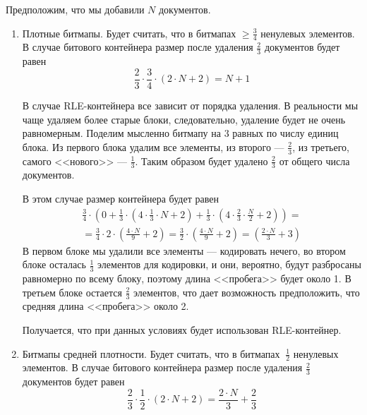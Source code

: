 Предположим, что мы добавили $N$ документов.
\begin{enumerate}
    \item Плотные битмапы. Будет считать, что в битмапах $\geq \frac{3}{4}$
    ненулевых элементов. В случае битового контейнера размер после удаления
    $\frac{2}{3}$ документов будет равен
    \begin{equation}
        \frac{2}{3} \cdot \frac{3}{4} \cdot \left(2\cdot N + 2\right) = N + 1
    \end{equation}
    
    В случае RLE-контейнера все зависит от порядка удаления. В реальности
    мы чаще удаляем более старые блоки, следовательно, удаление будет не очень
    равномерным. Поделим мысленно битмапу на 3 равных по числу единиц блока.
    Из первого блока удалим все элементы, из второго — $\frac{2}{3}$, из
    третьего, самого <<нового>> — $\frac{1}{3}$. Таким образом будет удалено
    $\frac{2}{3}$ от общего числа документов.

    В этом случае размер контейнера будет равен
    \begin{multline}
        \frac{3}{4} \cdot \left(0 +
            \frac{1}{3} \cdot \left(4 \cdot \frac{1}{3} \cdot N + 2\right) +
            \frac{1}{3} \cdot \left(4 \cdot \frac{2}{3} \cdot \frac{N}{2} + 2\right)
            \right) =\\
            = \frac{3}{4} \cdot 2 \cdot \left(\frac{4 \cdot N}{9} + 2\right)
            = \frac{3}{2} \cdot \left(\frac{4 \cdot N}{9} + 2\right)
            = \left(\frac{2 \cdot N}{3} + 3\right)
    \end{multline}
    В первом блоке мы удалили все элементы — кодировать нечего, во втором блоке
    осталась $\frac{1}{3}$ элементов для кодировки, и они, вероятно, будут
    разбросаны равномерно по всему блоку, поэтому длина <<пробега>> будет около 1.
    В третьем блоке остается $\frac{2}{3}$ элементов, что дает возможность
    предположить, что средняя длина <<пробега>> около 2.

    Получается, что при данных условиях будет использован RLE-контейнер.

    \item Битмапы средней плотности. Будет считать, что в битмапах $~ \frac{1}{2}$
    ненулевых элементов. В случае битового контейнера размер после удаления
    $\frac{2}{3}$ документов будет равен
    \begin{equation}
        \frac{2}{3} \cdot \frac{1}{2} \cdot \left(2\cdot N + 2\right) = \frac{2\cdot N}{3} + \frac{2}{3}
    \end{equation}


\end{enumerate}
